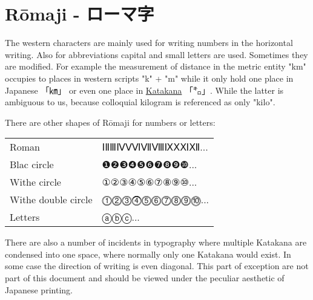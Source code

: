 \section{Rōmaji  - ローマ字} \label{sec:Romaji}



The western characters are mainly used for writing numbers in the horizontal
writing. Also for abbreviations capital and small letters are used. Sometimes
they are modified. For example the measurement of distance in the metric entity
"km" occupies to places in western scripts "k" + "m" while it only hold one
place in Japanese {「㎞」} or even one place in
\hyperref[sec:Katakana]{Katakana}  {「㌔」}. While the latter is ambiguous to
us, because colloquial kilogram is referenced as only "kilo".


There are other shapes of Rōmaji for numbers or letters:


\begin{center}
\begin{tabular}{ll}
Roman       &ⅠⅡⅢⅣⅤⅥⅦⅧⅨⅩⅪⅫ...\\
Blac circle & ❶❷❸❹❺❻❼❽❾❿...\\
Withe circle &①②③④⑤⑥⑦⑧⑨⑩...\\
Withe double circle & ⓵⓶⓷⓸⓹⓺⓻⓼⓽⓾...\\
Letters             &ⓐⓑⓒ...\\
\end{tabular}
\end{center}
\newpage
{}

There are also a number of incidents in typography where multiple Katakana are
condensed into one space, where normally only one Katakana would exist. In some
case the direction of writing is even diagonal. This part of exception are not
part of this document and should be viewed under the peculiar aesthetic of
Japanese printing.

